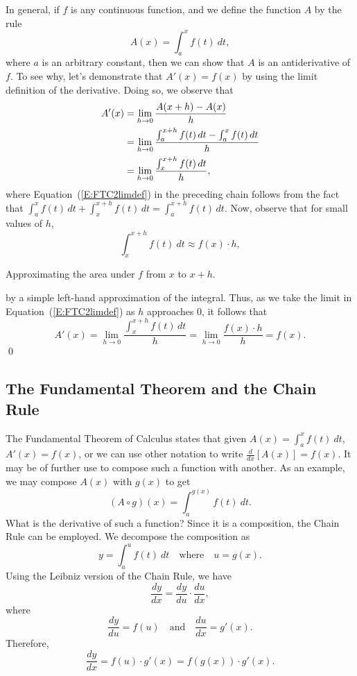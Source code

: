 \proof In general, if $f$ is any continuous function, and we define the function $A$ by the rule 
\[ A(x) = \int_a^x f(t) \ dt, \]
where $a$ is an arbitrary constant, then we can show that $A$ is an antiderivative of $f$.  To see why, let's demonstrate that $A'(x) = f(x)$ by using the limit definition of the derivative.  Doing so, we observe that
\begin{align}
A'(x) &= \lim_{h \to 0} \frac{A(x+h) - A(x)}{h} \notag \\
&= \lim_{h \to 0} \frac{\int_a^{x+h} f(t) \, dt - \int_a^x f(t) \, dt}{h} \notag \\
&= \lim_{h \to 0} \frac{\int_x^{x+h} f(t) \, dt}{h}, \label{E:FTC2limdef}
\end{align}
where Equation~(\ref{E:FTC2limdef}) in the preceding chain follows from the fact that $\int_a^x f(t) \,dt + \int_x^{x+h} f(t) \, dt = \int_a^{x+h} f(t) \, dt$.  Now, observe that for small values of $h$,
\[ \int_x^{x+h} f(t) \ dt \approx f(x) \cdot h, \]
\begin{marginfigure} %
\caption{Approximating the area under $f$ from $x$ to $x+h$.} \label{fig:4-4_FTCh}
\end{marginfigure}
\noindent by a simple left-hand approximation of the integral. Thus, as we take the limit in Equation~(\ref{E:FTC2limdef}) as $h$ approaches $0$, it follows that
\[ A'(x) =  \lim_{h \to 0} \frac{\int_x^{x+h} f(t) \, dt}{h} = \lim_{h \to 0} \frac{f(x) \cdot h}{h} = f(x). \]
\qed




\subsection{The Fundamental Theorem and the Chain Rule}

The Fundamental Theorem of Calculus states that given $A(x) = \int_a^x f(t)\ dt$,  $A'(x) = f(x)$, or we can use other notation to write $\frac{d}{dx}\left[ A(x) \right] = f(x)$. It may be of further use to compose such a function with another. As an example, we may compose $A(x)$ with $g(x)$ to get 
\[ (A \circ g)(x) = \int_a^{g(x)} f(t) \ dt.\]
What is the derivative of such a function? Since it is a composition, the Chain Rule can be employed.  We decompose the composition as
\[ y = \int_a^u f(t) \ dt \quad \mbox{where} \quad u = g(x). \]
Using the Leibniz version of the Chain Rule, we have
\[ \frac{dy}{dx} = \frac{dy}{du} \cdot \frac{du}{dx}, \] 
where
\[ \frac{dy}{du} = f(u) \quad \mbox{and} \quad \frac{du}{dx} = g'(x). \]
Therefore,
\[ \frac{dy}{dx} = f(u) \cdot g'(x) = f \left( g(x) \right) \cdot g'(x). \]

